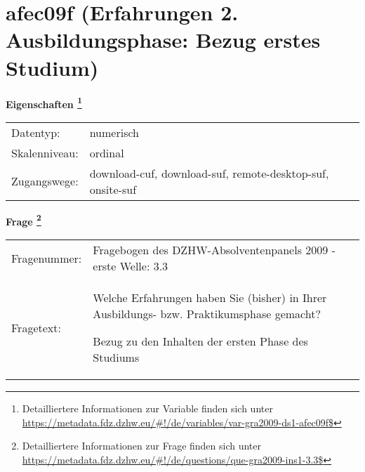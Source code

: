 
    \setcounter{footnote}{0}

    \vspace*{-1.8cm}
	\section{afec09f (Erfahrungen 2. Ausbildungsphase: Bezug erstes Studium)}
	\label{section:afec09f}



    \vspace*{0.5cm}
    \noindent\textbf{Eigenschaften
	\footnote{Detailliertere Informationen zur Variable finden sich unter
		\url{https://metadata.fdz.dzhw.eu/\#!/de/variables/var-gra2009-ds1-afec09f$}}}\\
	\begin{tabularx}{\hsize}{@{}lX}
	Datentyp: & numerisch \\
	Skalenniveau: & ordinal \\
	Zugangswege: &
	  download-cuf, 
	  download-suf, 
	  remote-desktop-suf, 
	  onsite-suf
 \\
    \end{tabularx}



				\vspace*{0.5cm}
                \noindent\textbf{Frage
	                \footnote{Detailliertere Informationen zur Frage finden sich unter
		              \url{https://metadata.fdz.dzhw.eu/\#!/de/questions/que-gra2009-ins1-3.3$}}}\\
				\begin{tabularx}{\hsize}{@{}lX}
					Fragenummer: &
					  Fragebogen des DZHW-Absolventenpanels 2009 - erste Welle:
					  3.3
 \\
					Fragetext: & Welche Erfahrungen haben Sie (bisher) in Ihrer Ausbildungs- bzw. Praktikumsphase gemacht?\par  Bezug zu den Inhalten der ersten Phase des Studiums \\
				\end{tabularx}






